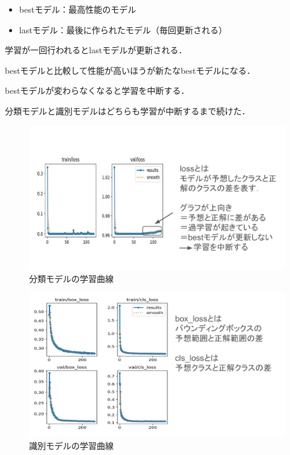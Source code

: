
\begin{itemize}
	\item bestモデル：最高性能のモデル
	\item lastモデル：最後に作られたモデル（毎回更新される）
\end{itemize}

学習が一回行われるとlastモデルが更新される．

bestモデルと比較して性能が高いほうが新たなbestモデルになる．

bestモデルが変わらなくなると学習を中断する．

分類モデルと識別モデルはどちらも学習が中断するまで続けた．

\newpage



\begin{figure}
	\centering
	\includegraphics[width=0.8\linewidth]{fig/results_cls}
	\caption[分類モデルの学習曲線]{分類モデルの学習曲線}
	\label{fig:resultscls}
\end{figure}

\newpage

\begin{figure}
	\centering
	\includegraphics[width=0.8\linewidth]{fig/results_det}
	\caption[識別モデルの学習曲線]{識別モデルの学習曲線}
	\label{fig:resultsdet}
\end{figure}


